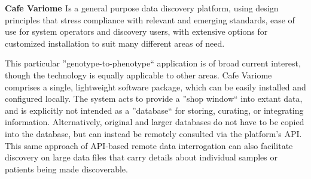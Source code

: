 
\textbf{Cafe Variome \cite{cafevariome}}
Is a general purpose data discovery platform, using design principles that stress
compliance with relevant and emerging standards, ease of use for system operators and
discovery users, with extensive options for customized installation to suit many
different areas of need.

This particular ''genotype-to-phenotype`` application is of broad current interest,
though the technology is equally applicable to other areas.
Cafe Variome comprises a single, lightweight software package, which can be easily
installed and configured locally.
The system acts to provide a ''shop window`` into extant data, and is explicitly not
intended as a ''database`` for storing, curating, or integrating information.
Alternatively, original and larger databases do not have to be copied into the
database, but can instead be remotely consulted via the platform’s API.
This same approach of API-based remote data interrogation can also facilitate discovery
on large data files that carry details about individual samples or patients being made
discoverable.

